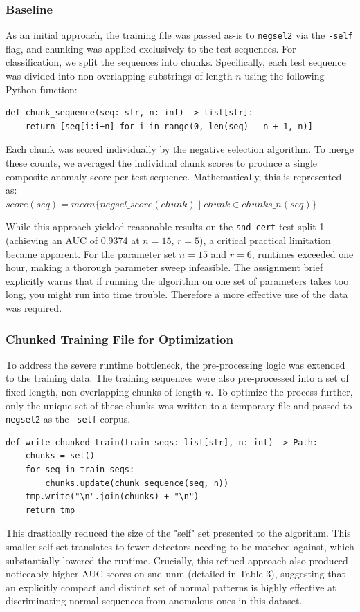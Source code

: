 \documentclass{article}
\begin{document}
\subsubsection{Baseline}
As an initial approach, the training file was passed as-is to \texttt{negsel2} via the \texttt{-self} flag, and chunking was applied exclusively to the test sequences. For classification, we split the sequences into chunks. Specifically, each test sequence was divided into non-overlapping 
substrings of length $n$ using the following Python function:
\begin{verbatim}
def chunk_sequence(seq: str, n: int) -> list[str]:
    return [seq[i:i+n] for i in range(0, len(seq) - n + 1, n)]
\end{verbatim}
Each chunk was scored individually by the negative selection algorithm. To merge these counts, we averaged the individual chunk scores to produce a single composite anomaly score per test sequence. Mathematically, this is represented as:\\
$score(seq) = mean \{ negsel\_score(chunk) \mid chunk \in chunks\_n(seq) \}$

While this approach yielded reasonable results on the \texttt{snd-cert} test split 1 (achieving an AUC of 0.9374 at $n = 15$, $r = 5$), a critical practical limitation became apparent. For the parameter set $n=15$ and $r=6$, runtimes exceeded one hour, making a thorough parameter sweep infeasible. The assignment brief explicitly warns that if running the algorithm on one set of parameters takes too long, you might run into time trouble. Therefore a more effective use of the data was required.

\subsubsection{Chunked Training File for Optimization}
To address the severe runtime bottleneck, the pre-processing logic was extended to the training data. The training sequences were also pre-processed into a set of fixed-length, non-overlapping chunks of length $n$. To optimize the process further, only the unique set of these chunks 
was written to a temporary file and passed to \texttt{negsel2} as the \texttt{-self} corpus.

\begin{verbatim}
def write_chunked_train(train_seqs: list[str], n: int) -> Path:
    chunks = set()
    for seq in train_seqs:
        chunks.update(chunk_sequence(seq, n))
    tmp.write("\n".join(chunks) + "\n") 
    return tmp
\end{verbatim}
This drastically reduced the size of the "self" set presented to the algorithm. This smaller self set translates to fewer detectors needing to be matched against, which substantially lowered the runtime. Crucially, this refined approach also produced noticeably higher AUC scores on snd-unm (detailed in Table 3), suggesting that an explicitly compact and distinct set of normal patterns is highly effective at discriminating normal sequences from anomalous ones in this dataset.
\end{document}
